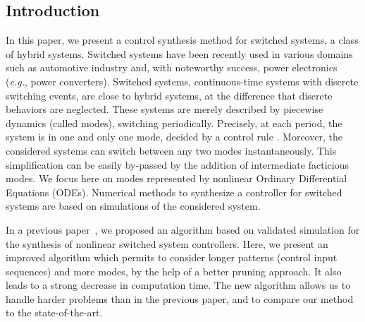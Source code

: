 \subsection{Introduction}
\label{intro}

In this paper, we present a control synthesis method for switched
systems, a class of hybrid systems.  Switched systems have been
recently used in various domains such as automotive industry and, with
noteworthy success, power electronics (\emph{e.g.}, power
converters). Switched systems, continuous-time systems with discrete
switching events, are close to hybrid systems, at the difference that
discrete behaviors are neglected. These systems are merely described
by piecewise dynamics (called modes), switching periodically.
Precisely, at each period, the system is in one and only one mode,
decided by a control rule
\cite{fribourg2014finite,liberzon2012switching}. Moreover, the
considered systems can switch between any two modes
instantaneously. This simplification can be easily by-passed by the
addition of intermediate facticious modes.  We focus here on modes
represented by nonlinear Ordinary Differential Equations (ODEs).
Numerical methods to synthesize a controller for switched systems are
based on simulations of the considered system.

In a previous paper~\cite{NL_minimator}, we proposed an algorithm
based on validated simulation for the synthesis of nonlinear switched
system controllers. Here, we present an improved algorithm which
permits to consider longer patterns (control input sequences) and more
modes, by the help of a better pruning approach.  It also leads to a
strong decrease in computation time. The new algorithm allows us to
handle harder problems than in the previous paper, and to compare our
method to the state-of-the-art.
